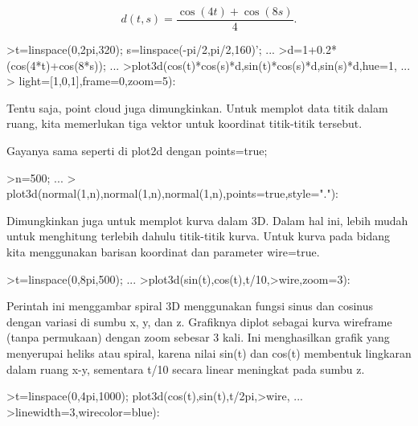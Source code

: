 \documentclass{article}
\begin{document}
\begin{eulernotebook}
\begin{eulercomment}
\begin{eulercomment}
\begin{eulercomment}
\begin{eulercomment}
\begin{eulercomment}
\begin{eulercomment}
\begin{eulercomment}
\end{eulercomment}
\begin{eulerformula}
\[
d(t,s) = \frac{\cos(4t)+\cos(8s)}{4}.
\]
\end{eulerformula}
\begin{eulerprompt}
>t=linspace(0,2pi,320); s=linspace(-pi/2,pi/2,160)'; ...
>d=1+0.2*(cos(4*t)+cos(8*s)); ...
>plot3d(cos(t)*cos(s)*d,sin(t)*cos(s)*d,sin(s)*d,hue=1, ...
>  light=[1,0,1],frame=0,zoom=5):
\end{eulerprompt}
\begin{eulercomment}
Tentu saja, point cloud juga dimungkinkan. Untuk memplot data titik
dalam ruang, kita memerlukan tiga vektor untuk koordinat titik-titik
tersebut.

Gayanya sama seperti di plot2d dengan points=true;
\end{eulercomment}
\begin{eulerprompt}
>n=500;  ...
>  plot3d(normal(1,n),normal(1,n),normal(1,n),points=true,style="."):
\end{eulerprompt}
\begin{eulercomment}
Dimungkinkan juga untuk memplot kurva dalam 3D. Dalam hal ini, lebih
mudah untuk menghitung terlebih dahulu titik-titik kurva. Untuk kurva
pada bidang kita menggunakan barisan koordinat dan parameter
wire=true.
\end{eulercomment}
\begin{eulerprompt}
>t=linspace(0,8pi,500); ...
>plot3d(sin(t),cos(t),t/10,>wire,zoom=3):
\end{eulerprompt}
\begin{eulercomment}
Perintah ini menggambar spiral 3D menggunakan fungsi sinus dan cosinus
dengan variasi di sumbu x, y, dan z. Grafiknya diplot sebagai kurva
wireframe (tanpa permukaan) dengan zoom sebesar 3 kali. Ini
menghasilkan grafik yang menyerupai heliks atau spiral, karena nilai
sin(t) dan cos(t) membentuk lingkaran dalam ruang x-y, sementara t/10
secara linear meningkat pada sumbu z.
\end{eulercomment}
\begin{eulerprompt}
>t=linspace(0,4pi,1000); plot3d(cos(t),sin(t),t/2pi,>wire, ...
>linewidth=3,wirecolor=blue):
\end{eulerprompt}
\begin{eulercomment}

\end{eulercomment}
\end{eulercomment}
\end{eulercomment}
\end{eulercomment}
\end{eulercomment}
\end{eulercomment}
\end{eulercomment}
\end{eulernotebook}
\end{document}
